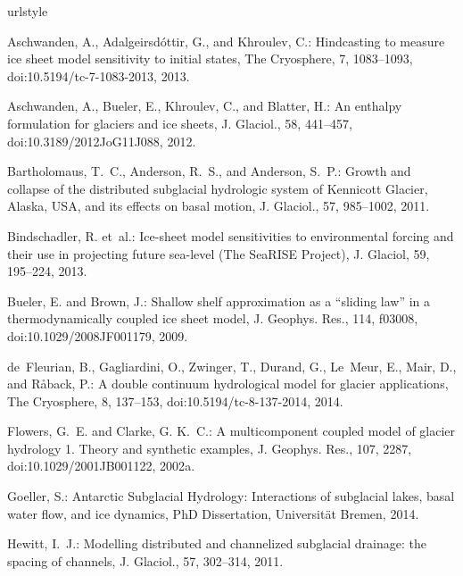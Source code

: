\documentclass[11pt,reqno]{amsart}
\begin{document}
\begin{thebibliography}{}
\providecommand{\natexlab}[1]{#1}
\providecommand{\url}[1]{{\tt #1}}
\providecommand{\urlprefix}{URL }
\expandafter\ifx\csname urlstyle\endcsname\relax
  \providecommand{\doi}[1]{doi:\discretionary{}{}{}#1}\else
  \providecommand{\doi}{doi:\discretionary{}{}{}\begingroup
  \urlstyle{rm}\Url}\fi

Aschwanden, A., Adalgeirsd{\'o}ttir, G., and Khroulev, C.: Hindcasting to
  measure ice sheet model sensitivity to initial states, The Cryosphere, 7,
  1083--1093, \doi{10.5194/tc-7-1083-2013}, 2013.

Aschwanden, A., Bueler, E., Khroulev, C., and Blatter, H.: An enthalpy
  formulation for glaciers and ice sheets, J. Glaciol., 58, 441--457,
  \doi{10.3189/2012JoG11J088}, 2012.

Bartholomaus, T.~C., Anderson, R.~S., and Anderson, S.~P.: Growth and collapse
  of the distributed subglacial hydrologic system of {K}ennicott {G}lacier,
  {A}laska, {USA}, and its effects on basal motion, J. Glaciol., 57, 985--1002,
  2011.

Bindschadler, R. et~al.: Ice-sheet model sensitivities to environmental forcing
  and their use in projecting future sea-level ({T}he {S}ea{RISE} {P}roject),
  J. Glaciol, 59, 195--224, 2013.

Bueler, E. and Brown, J.: Shallow shelf approximation as a ``sliding law'' in a
  thermodynamically coupled ice sheet model, J. Geophys. Res., 114, f03008,
  doi:10.1029/2008JF001179, 2009.

de~Fleurian, B., Gagliardini, O., Zwinger, T., Durand, G., Le~Meur, E., Mair,
  D., and R{\aa}back, P.: A double continuum hydrological model for glacier
  applications, The Cryosphere, 8, 137--153, \doi{10.5194/tc-8-137-2014}, 2014.

Flowers, G.~E. and Clarke, G. K.~C.: A multicomponent coupled model of glacier
  hydrology 1. {T}heory and synthetic examples, J. Geophys. Res., 107, 2287,
  \doi{10.1029/2001JB001122}, 2002{\natexlab{a}}.

Goeller, S.: Antarctic {S}ubglacial {H}ydrology: {I}nteractions of subglacial lakes, basal water flow, and ice dynamics, PhD Dissertation, Universit\"at Bremen, 2014.

Hewitt, I.~J.: Modelling distributed and channelized subglacial drainage: the
  spacing of channels, J. Glaciol., 57, 302--314, 2011.


\end{thebibliography}
\end{document}
